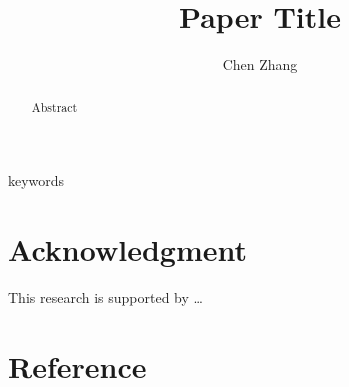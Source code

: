 \documentclass[authoryear,preprint,review,12pt]{elsarticle}
\begin{document}
    \begin{frontmatter}
        \title{Paper Title}
        \author[a,b]{Chen Zhang }
        \address[a]{Center for Spatial Information Science and Systems, George Mason University, Fairfax, VA 22030, USA}
        \address[b]{Department of Geography and Geoinformation Science, George Mason University, Fairfax, VA 22030, USA}
        \begin{abstract}
        Abstract
        \end{abstract}
        \begin{keyword}
        keywords
        \end{keyword}
    \end{frontmatter}

    \linenumbers
    
    
    
    
    

    \section*{Acknowledgment}
    This research is supported by \dots
    
    \section*{Reference}
    
    
\end{document}
